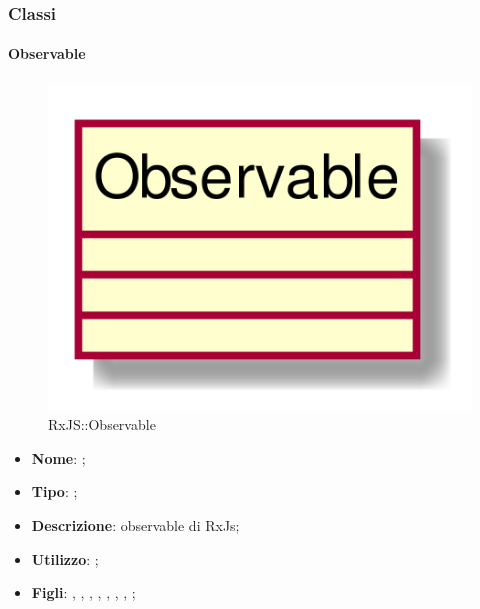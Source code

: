 \subsubsection{Classi}
\hypertarget{Observable_label}{\paragraph{Observable}}
\begin{figure}[h]
	\centering
	\includegraphics[width=\textwidth,height=\textheight,keepaspectratio]{images/ClassObservable.png}
	\caption{RxJS::Observable}
\end{figure}
\begin{itemize}
	\item \textbf{Nome}: ;
	\item \textbf{Tipo}: ;
	\item \textbf{Descrizione}: observable di RxJs;
	\item \textbf{Utilizzo}: ;
	\item \textbf{Figli}: , , , , , , , ;
\end{itemize}
\FloatBarrier


